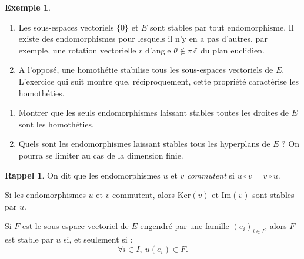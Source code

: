 \documentclass[french]{article}
\newcommand{\Z}{\mathbb{Z}}
\renewcommand{\ker}{\text{Ker}}
\theoremstyle{plain}
\theoremstyle{definition}
\newtheorem*{ex}{Exemple}
\newtheorem*{rappel}{Rappel}
\theoremstyle{remark}
\begin{document}
\begin{ex}
	\begin{enumerate}
		\item Les sous-espaces vectoriels $\{0\}$ et $E$ sont stables par tout endomorphisme. Il existe des endomorphismes pour lesquels il n'y en a pas d'autres. par exemple, une rotation vectorielle $r$ d'angle $\theta\notin\pi\Z$ du plan euclidien.
		\item A l'opposé, une homothétie stabilise tous les sous-espaces vectoriels de $E$. L'exercice qui suit montre que, réciproquement, cette propriété caractérise les homothéties.
	\end{enumerate}
\end{ex}

\begin{exo}
	\begin{enumerate}
		\item Montrer que les seuls endomorphismes laissant stables toutes les droites de $E$ sont les homothéties.
		\item Quels sont les endomorphismes laissant stables tous les hyperplans de $E$ ? On pourra se limiter au cas de la dimension finie.
	\end{enumerate}
\end{exo}

\begin{rappel}
	On dit que les endomorphismes $u$ et $v$ \textit{commutent} si $u\circ v=v\circ u$.
\end{rappel}

\begin{prop}%
	Si les endomorphismes $u$ et $v$ commutent, alors $\ker(v)$ et $\text{Im}(v)$ sont stables par $u$.
\end{prop}

\begin{prop}%
	Si $F$ est le sous-espace vectoriel de $E$ engendré par une famille $(e_i)_{i\in I}$, alors $F$ est stable par $u$ si, et seulement si : $$\forall i\in I,\ u(e_i)\in F.$$
\end{prop}
\end{document}
